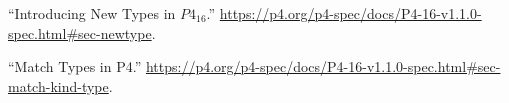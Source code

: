\documentclass[11pt]{article}
\begin{document}
{{\begin{thebibliography}{35}
\mdbibitemlabel{{}[11]}\textquotedblleft{}Introducing New Types in $P4_{16}$.\textquotedblright{} \href{https://p4.org/p4-spec/docs/P4-16-v1.1.0-spec.html\%23sec-newtype}{{\ttfamily https://\hspace{0pt}p4.\hspace{0pt}org/\hspace{0pt}p4-\hspace{0pt}spec/\hspace{0pt}docs/\hspace{0pt}P4-\hspace{0pt}16-\hspace{0pt}v1.\hspace{0pt}1.\hspace{0pt}0-\hspace{0pt}spec.\hspace{0pt}html\#\hspace{0pt}sec-\hspace{0pt}newtype}}.\label{p4newtypes}%

\mdbibitemlabel{{}[12]}\textquotedblleft{}Match Types in P4.\textquotedblright{} \href{https://p4.org/p4-spec/docs/P4-16-v1.1.0-spec.html\%23sec-match-kind-type}{{\ttfamily https://\hspace{0pt}p4.\hspace{0pt}org/\hspace{0pt}p4-\hspace{0pt}spec/\hspace{0pt}docs/\hspace{0pt}P4-\hspace{0pt}16-\hspace{0pt}v1.\hspace{0pt}1.\hspace{0pt}0-\hspace{0pt}spec.\hspace{0pt}html\#\hspace{0pt}sec-\hspace{0pt}match-\hspace{0pt}kind-\hspace{0pt}type}}.\label{p4matchtypes}%


\end{thebibliography}}}
\end{document}
